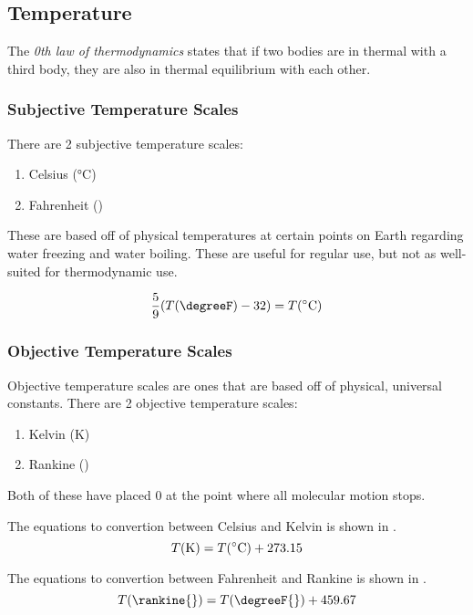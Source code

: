 \subsection{Temperature}\label{subsec:Temperature}
\begin{definition}\label{def:0_Law_Thermo}
  The \emph{0th law of thermodynamics} states that if two bodies are in thermal  with a third body, they are also in thermal equilibrium with each other.
\end{definition}

\subsubsection{Subjective Temperature Scales}\label{subsubsec:Subjective_Temp_Scales}
There are 2 subjective temperature scales:
\begin{enumerate}[noitemsep]
\item Celsius (\si{\degreeCelsius})
\item Fahrenheit (\si{\degreeF})
\end{enumerate}

These are based off of physical temperatures at certain points on Earth regarding water freezing and water boiling.
These are useful for regular use, but not as well-suited for thermodynamic use.

\begin{equation}\label{eq:Fahrenheit_Celsius}
  \frac{5}{9} (\Temp(\si{\degreeF}) - 32) = \Temp(\si{\degreeCelsius})
\end{equation}

\subsubsection{Objective Temperature Scales}\label{subsubsec:Objective_Temp_Scales}
Objective temperature scales are ones that are based off of physical, universal constants.
There are 2 objective temperature scales:
\begin{enumerate}[noitemsep]
\item Kelvin (\si{\kelvin})
\item Rankine (\si{\rankine})
\end{enumerate}

Both of these have placed $0$ at the point where all molecular motion stops.

The equations to convertion between Celsius and Kelvin is shown in .
\begin{equation}\label{eq:Celsius_Kelvin}
  \Temp(\si{\kelvin{}}) = \Temp(\si{\degreeCelsius}) + 273.15
\end{equation}

The equations to convertion between Fahrenheit and Rankine is shown in .
\begin{equation}\label{eq:Fahrenheit_Rankine}
  \Temp(\si{\rankine{}}) = \Temp(\si{\degreeF{}}) + 459.67
\end{equation}

